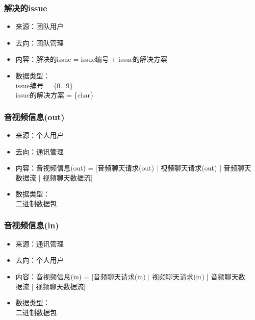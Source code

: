             \subsubsection{\color{red} 解决的issue}
            \begin{itemize}
            \item 来源：团队用户
            \item 去向：团队管理
            \item 内容：解决的issue = issue编号 + issue的解决方案
            \item 数据类型：\\
            issue编号 = \{0...9\}\\
            issue的解决方案 = \{char\}\\
            \end{itemize}


            \subsubsection{音视频信息(out)}
            \begin{itemize}
                \item 来源：个人用户
                \item 去向：通讯管理
                \item 内容：音视频信息(out) = [音频聊天请求(out) | 视频聊天请求(out) | 音频聊天数据流 | 视频聊天数据流]
                \item 数据类型：\\
                    二进制数据包\\
            \end{itemize}
            \subsubsection{音视频信息(in)}
            \begin{itemize}
                    \item 来源：通讯管理
                    \item 去向：个人用户
                    \item 内容：音视频信息(in) = [音频聊天请求(in) | 视频聊天请求(in) | 音频聊天数据流 | 视频聊天数据流]
                    \item 数据类型：\\
                    二进制数据包\\
            \end{itemize}
